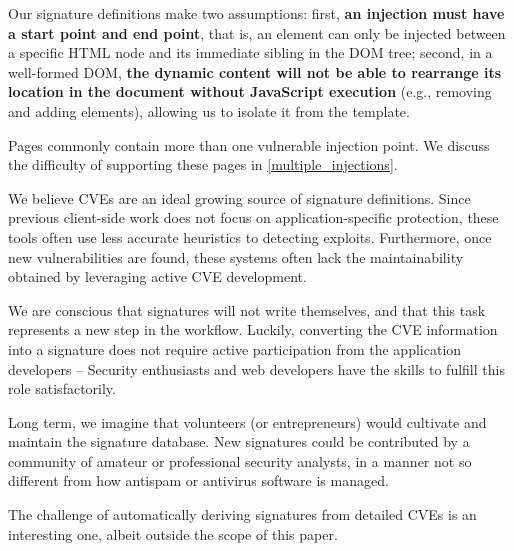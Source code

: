 Our signature definitions make two assumptions: first,
\textbf{an injection must have a start point and end point}, that is,
an element can only be injected between a specific HTML node and its
immediate sibling in the DOM tree; second, in a well-formed DOM,
\textbf{the dynamic content will not be able to rearrange its location
  in the document without JavaScript execution} (e.g., removing and
adding elements), allowing us to isolate it from the template.

Pages commonly contain more than one vulnerable injection point.
We discuss the difficulty of supporting these pages in \autoref{multiple_injections}.

We believe CVEs are an ideal growing source of signature
definitions. Since previous client-side work does not focus on
application-specific protection, these tools often use less accurate
heuristics to detecting exploits. Furthermore, once new
vulnerabilities are found, these systems often lack the
maintainability obtained by leveraging active CVE development.

We are conscious that \sys signatures will not write themselves, and that
this task represents a new step in the workflow. Luckily, converting
the CVE information into a signature does not require active
participation from the application developers -- Security enthusiasts and
web developers have the skills to fulfill this role satisfactorily.

Long term, we imagine that volunteers (or entrepreneurs) would
cultivate and maintain the signature database. New signatures could be
contributed by a community of amateur or professional security analysts, in a manner not
so different from how antispam or antivirus software is managed.

The challenge of automatically deriving signatures from detailed CVEs is an interesting
one, albeit outside the scope of this paper.


